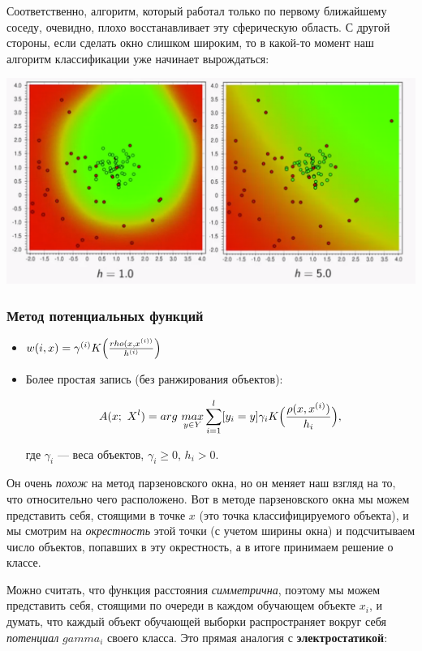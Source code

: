\documentclass{article}
\begin{document}
Соответственно, алгоритм, который работал только по первому ближайшему соседу, очевидно, плохо восстанавливает эту сферическую область. С другой стороны, если сделать окно слишком широким, то в какой-то момент наш алгоритм классификации уже начинает вырождаться:

\begin{center}
    \includegraphics[scale=0.35]{images/4_4.png}
\end{center}

\newpage
\subsubsection{Метод потенциальных функций}

\begin{itemize}
\item[] $w(i, x) = \gamma^{(i)}K\Bigl(\frac{rho(x, x^{(i))}}{h^{(i)}}\Bigr)$

\item[] Более простая запись (без ранжирования объектов):

$$A(x;\ X^l) = arg\ \underset{y \in Y}{max}
\sum\limits_{i = 1}^l[y_i = y]\gamma_i K\Bigl(\frac{\rho(x, x^{(i)})}
{h_i}\Bigr),$$

где $\gamma_i$ --- веса объектов, $\gamma_i \geqslant 0$, $h_i > 0$.
\end{itemize}

Он очень \textit{похож} на метод парзеновского окна, но он меняет наш взгляд на то, что относительно чего расположено. Вот в методе парзеновского окна мы можем представить себя, стоящими в точке $x$ (это точка классифицируемого объекта), и мы смотрим на \textit{окрестность} этой точки (с учетом ширины окна) и подсчитываем число объектов, попавших в эту окрестность, а в итоге принимаем решение о классе.

Можно считать, что функция расстояния \textit{симметрична}, поэтому мы можем представить себя, стоящими по очереди в каждом обучающем объекте $x_i$, и думать, что каждый объект обучающей выборки распространяет вокруг себя \textit{потенциал} $gamma_i$ своего класса. Это прямая аналогия с \textbf{электростатикой}:
\end{document}
